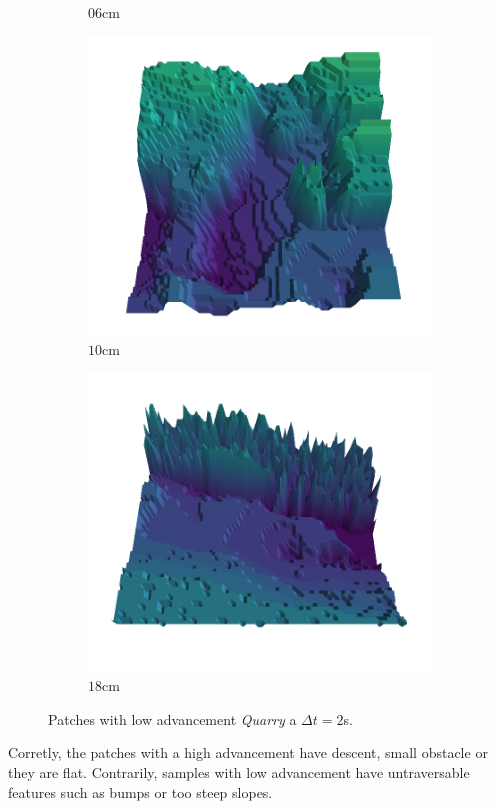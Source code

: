 \documentclass[../document.tex]{subfiles}
\begin{document}
\begin{figure}[H]
\begin{subfigure}[b]{0.19\textwidth}
        \caption{$06$cm}
        \end{subfigure}
        \begin{subfigure}[b]{0.19\textwidth}
        \includegraphics[width=\linewidth]{../img/5/quarry/all/worst/10-patch-3d-majavi-colormap-8.png}
        \caption{$10$cm}
        \end{subfigure}
        \begin{subfigure}[b]{0.19\textwidth}
        \includegraphics[width=\linewidth]{../img/5/quarry/all/worst/18-patch-3d-majavi-colormap-9.png}
        \caption{$18$cm}
        \end{subfigure}
        \caption{Patches with low advancement \emph{Quarry} a $\Delta t = 2$s.}
    \end{figure}
Corretly, the patches with a high advancement have descent, small obstacle or they are flat. Contrarily, samples with low advancement have untraversable features such as bumps or too steep slopes.
\end{document}

